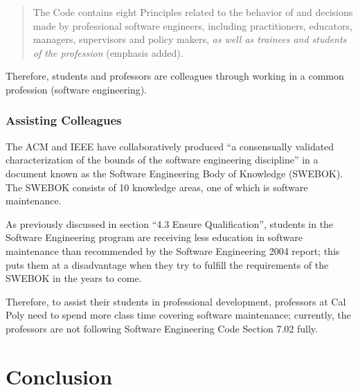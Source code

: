 \documentclass[11pt]{article}
\begin{document}
\begin{multicols}{2}
\begin{quote}
The Code contains eight Principles related to the behavior of and decisions made by professional software engineers, including practitioners, educators, managers, supervisors and policy makers, \emph{as well as trainees and students of the profession} (emphasis added). \cite{secode}
\end{quote}

Therefore, students and professors are colleagues through working in a common profession (software engineering).

\subsubsection{Assisting Colleagues}

The ACM and IEEE have collaboratively produced ``a consensually validated characterization of the bounds of the software engineering discipline'' in a document known as the Software Engineering Body of Knowledge (SWEBOK). \cite{swebok}  The SWEBOK consists of 10 knowledge areas, one of which is software maintenance. \cite{swebok}

As previously discussed in section ``4.3 Ensure Qualification'', students in the Software Engineering program are receiving less education in software maintenance than recommended by the Software Engineering 2004 report; this puts them at a disadvantage when they try to fulfill the requirements of the SWEBOK in the years to come.

Therefore, to assist their students in professional development, professors at Cal Poly need to spend more class time covering software maintenance; currently, the professors are not following Software Engineering Code Section 7.02 fully.



\section{Conclusion}

\end{multicols}
\newpage

\nocite{*}




\end{document}
